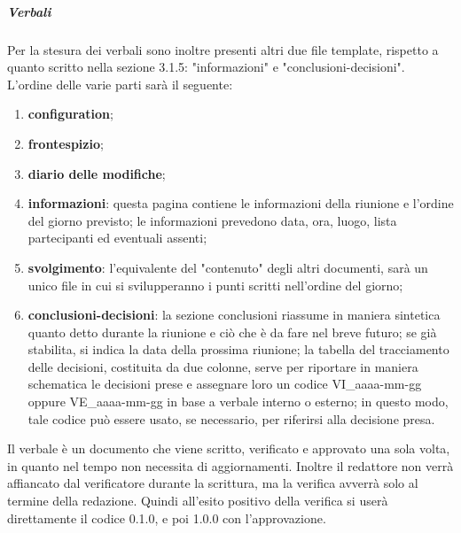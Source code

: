 \subparagraph{Verbali} \hfill \linebreak
Per la stesura dei verbali sono inoltre presenti altri due file template, rispetto a quanto scritto nella 
sezione 3.1.5: "informazioni" e "conclusioni-decisioni". \\
L'ordine delle varie parti sarà il seguente:
\begin{enumerate}
        \item \textbf{configuration};
        \item \textbf{frontespizio};
        \item \textbf{diario delle modifiche};
        \item \textbf{informazioni}: 
                questa pagina contiene le informazioni della riunione e l'ordine del giorno previsto;
                le informazioni prevedono data, ora, luogo, lista partecipanti ed eventuali assenti;
        \item \textbf{svolgimento}:
                l'equivalente del "contenuto" degli altri documenti, sarà un unico file in cui si 
                svilupperanno i punti scritti nell'ordine del giorno;
        \item \textbf{conclusioni-decisioni}:
                la sezione conclusioni riassume in maniera sintetica quanto detto durante la riunione e  
                ciò che è da fare nel breve futuro; se già stabilita, si indica la data della prossima 
                riunione; \newline
                la tabella del tracciamento delle decisioni, costituita da due colonne, serve per 
                riportare in maniera schematica le decisioni prese e assegnare loro un codice 
                VI\_aaaa-mm-gg oppure VE\_aaaa-mm-gg in base a verbale interno o esterno; in questo modo, tale codice può essere usato, se necessario, per riferirsi alla decisione presa.
\end{enumerate}
Il verbale è un documento che viene scritto, verificato e approvato una sola volta, 
in quanto nel tempo non necessita di aggiornamenti.
Inoltre il redattore non verrà affiancato dal verificatore durante la scrittura, ma la verifica avverrà solo 
al termine della redazione. Quindi all'esito positivo della verifica si userà direttamente il codice 0.1.0, 
e poi 1.0.0 con l'approvazione.

